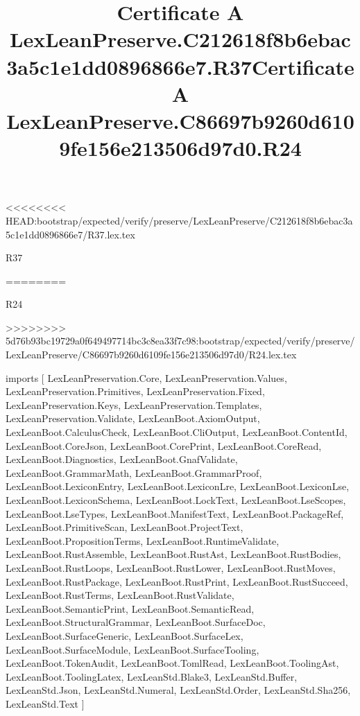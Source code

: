 <<<<<<<< HEAD:bootstrap/expected/verify/preserve/LexLeanPreserve/C212618f8b6ebac3a5c1e1dd0896866e7/R37.lex.tex
\begin{lexlean}{R37}
\title{Certificate A LexLeanPreserve.C212618f8b6ebac3a5c1e1dd0896866e7.R37}
========
\begin{lexlean}{R24}
\title{Certificate A LexLeanPreserve.C86697b9260d6109fe156e213506d97d0.R24}
>>>>>>>> 5d76b93bc19729a0f649497714bc3c8ea33f7c98:bootstrap/expected/verify/preserve/LexLeanPreserve/C86697b9260d6109fe156e213506d97d0/R24.lex.tex
\begin{coremodule}
imports [
  LexLeanPreservation.Core,
  LexLeanPreservation.Values,
  LexLeanPreservation.Primitives,
  LexLeanPreservation.Fixed,
  LexLeanPreservation.Keys,
  LexLeanPreservation.Templates,
  LexLeanPreservation.Validate,
  LexLeanBoot.AxiomOutput,
  LexLeanBoot.CalculusCheck,
  LexLeanBoot.CliOutput,
  LexLeanBoot.ContentId,
  LexLeanBoot.CoreJson,
  LexLeanBoot.CorePrint,
  LexLeanBoot.CoreRead,
  LexLeanBoot.Diagnostics,
  LexLeanBoot.GnafValidate,
  LexLeanBoot.GrammarMath,
  LexLeanBoot.GrammarProof,
  LexLeanBoot.LexiconEntry,
  LexLeanBoot.LexiconLre,
  LexLeanBoot.LexiconLse,
  LexLeanBoot.LexiconSchema,
  LexLeanBoot.LockText,
  LexLeanBoot.LseScopes,
  LexLeanBoot.LseTypes,
  LexLeanBoot.ManifestText,
  LexLeanBoot.PackageRef,
  LexLeanBoot.PrimitiveScan,
  LexLeanBoot.ProjectText,
  LexLeanBoot.PropositionTerms,
  LexLeanBoot.RuntimeValidate,
  LexLeanBoot.RustAssemble,
  LexLeanBoot.RustAst,
  LexLeanBoot.RustBodies,
  LexLeanBoot.RustLoops,
  LexLeanBoot.RustLower,
  LexLeanBoot.RustMoves,
  LexLeanBoot.RustPackage,
  LexLeanBoot.RustPrint,
  LexLeanBoot.RustSucceed,
  LexLeanBoot.RustTerms,
  LexLeanBoot.RustValidate,
  LexLeanBoot.SemanticPrint,
  LexLeanBoot.SemanticRead,
  LexLeanBoot.StructuralGrammar,
  LexLeanBoot.SurfaceDoc,
  LexLeanBoot.SurfaceGeneric,
  LexLeanBoot.SurfaceLex,
  LexLeanBoot.SurfaceModule,
  LexLeanBoot.SurfaceTooling,
  LexLeanBoot.TokenAudit,
  LexLeanBoot.TomlRead,
  LexLeanBoot.ToolingAst,
  LexLeanBoot.ToolingLatex,
  LexLeanStd.Blake3,
  LexLeanStd.Buffer,
  LexLeanStd.Json,
  LexLeanStd.Numeral,
  LexLeanStd.Order,
  LexLeanStd.Sha256,
  LexLeanStd.Text
]


\end{coremodule}
\end{lexlean}
\end{lexlean}
